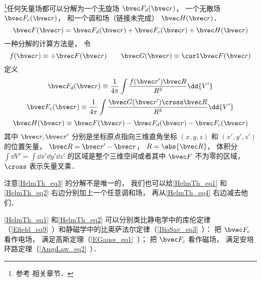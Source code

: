 
\begin{issues}
\issueTODO
\end{issues}


\footnote{参考 \cite{GriffE} 相关章节．}任何矢量场都可以分解为一个无旋场 $\bvec F_{d}(\bvec r)$， 一个无散场 $\bvec F_{c}(\bvec r)$， 和一个调和场（链接未完成） $\bvec H(\bvec r)$．
\begin{equation}\label{HelmTh_eq3}
\bvec F(\bvec r) = \bvec F_{d}(\bvec r) + \bvec F_{c}(\bvec r) + \bvec H(\bvec r)
\end{equation}
一种分解的计算方法是， 令
\begin{equation}
f(\bvec r) \equiv \div \bvec F(\bvec r) \qquad
\bvec G(\bvec r) \equiv \curl \bvec F(\bvec r)
\end{equation}
定义
\begin{equation}\label{HelmTh_eq1}
\bvec F_{d}(\bvec r) \equiv \frac{1}{4\pi}\int \frac{f(\bvec r') \bvec R}{R^3} \dd{V'}
\end{equation}
\begin{equation}\label{HelmTh_eq2}
\bvec F_{c}(\bvec r) \equiv \frac{1}{4\pi}\int \frac{\bvec G(\bvec r')\cross \bvec R}{R^3} \dd{V'}
\end{equation}
\begin{equation}\label{HelmTh_eq4}
\bvec H(\bvec r) \equiv \bvec F(\bvec r) - \bvec F_{d}(\bvec r) - \bvec F_{c}(\bvec r)
\end{equation}
其中 $\bvec r, \bvec r'$ 分别是坐标原点指向三维直角坐标 $(x, y, z)$ 和 $(x', y', z')$ 的位置矢量， $\bvec R = \bvec r' - \bvec r$， $R = \abs{\bvec R}$， 体积分 $\int\dd{V'} = \int\dd{x'}\dd{y'}\dd{z'}$ 的区域是整个三维空间或者其中 $\bvec F$ 不为零的区域， $\cross$ 表示矢量叉乘．

注意\autoref{HelmTh_eq3} 的分解不是唯一的， 我们也可以给\autoref{HelmTh_eq1} 和\autoref{HelmTh_eq2} 右边分别加上一个任意调和场， 再从\autoref{HelmTh_eq4} 右边减去他们．

\autoref{HelmTh_eq1} 和\autoref{HelmTh_eq2} 可以分别类比静电学中的库伦定律（\autoref{Efield_eq9}~）和静磁学中的比奥萨法尔定律（\autoref{BioSav_eq3}~）： 把 $\bvec F_c$ 看作电场， 满足高斯定理（\autoref{EGauss_eq1}~）； 把 $\bvec F_c$ 看作磁场， 满足安培环路定理（\autoref{AmpLaw_eq2}~）．

